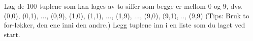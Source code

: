 %
%
Lag de 100 tuplene som kan lages av to siffer som begge er mellom 0 og 9, dvs. (0,0), (0,1), ..., (0,9), (1,0), (1,1), ..., (1,9), ..., (9,0), (9,1), .., (9,9)
(Tips: Bruk to for-løkker, den ene inni den andre.)
Legg tuplene inn i en liste som du laget ved start.
